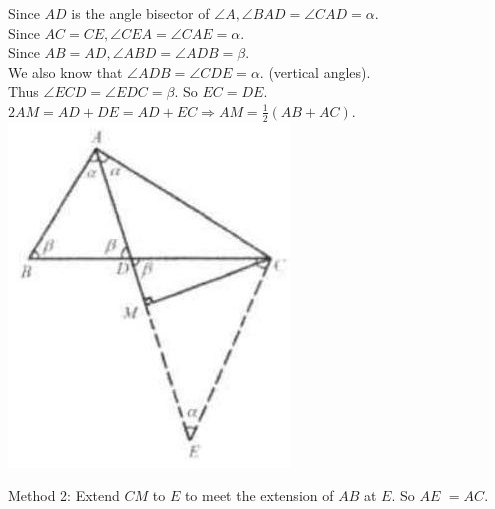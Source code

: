 \documentclass[10pt]{article}
\begin{document}
Since \(A D\) is the angle bisector of \(\angle A, \angle B A D=\angle C A D=\alpha\).\\
Since \(A C=C E, \angle C E A=\angle C A E=\alpha\).\\
Since \(A B=A D, \angle A B D=\angle A D B=\beta\).\\
We also know that \(\angle A D B=\angle C D E=\alpha\). (vertical angles).\\
Thus \(\angle E C D=\angle E D C=\beta\). So \(E C=D E\).\\
\(2 A M=A D+D E=A D+E C \Rightarrow A M=\frac{1}{2}(A B+A C)\).\\
\includegraphics[max width=\textwidth, center]{2025_04_17_97bc1f7e44d93c271a88g-058(1)}

Method 2:
Extend \(C M\) to \(E\) to meet the extension of \(A B\) at \(E\). So \(A E\) \(=A C\).
\end{document}
